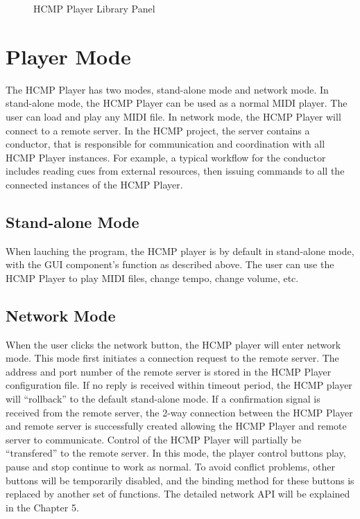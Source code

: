 \begin{figure}[H]
\caption{HCMP Player Library Panel}
\label{fig:speciation}
\end{figure}

\section{Player Mode}

The HCMP Player has two modes, stand-alone mode and network mode. 
In stand-alone mode, the HCMP Player can be used as a normal MIDI player. 
The user can load and play any MIDI file. In network mode, 
the HCMP Player will connect to a remote 
server. In the HCMP project, the server contains a conductor, that 
is responsible for communication and coordination with all HCMP Player instances. 
For example, 
a typical workflow for the conductor includes reading cues from external resources, 
then issuing commands to all the connected instances of the HCMP Player.

\subsection{Stand-alone Mode}

When lauching the program, the HCMP player is by default in stand-alone mode, 
with the GUI component's function as described above. 
The user can use the HCMP Player to play MIDI files, change tempo, change volume, etc.


\subsection{Network Mode}

When the user clicks the network button, 
the HCMP player will enter
network mode. This mode first initiates a connection request 
to the remote server. The address and port number of the remote server is 
stored in the HCMP Player configuration file. If no reply is received within
timeout period, the HCMP player will ``rollback'' to the default stand-alone mode.
If a confirmation signal is received from the
remote server, the 2-way connection between the HCMP Player and 
remote server is successfully created allowing the HCMP Player and 
remote server to communicate. Control of the HCMP 
Player will partially be ``transfered'' to the remote server. 
In this mode, the player control buttons play, pause   
and stop continue to work as normal. To avoid conflict problems, other buttons will 
be temporarily disabled, and the binding method for these buttons is replaced by
another set of functions. The detailed network API will be explained  
in the Chapter 5.
